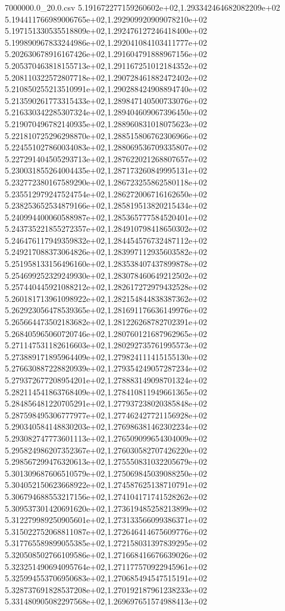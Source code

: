 \begin{filecontents*}{7000000.0_20.0.csv}
5.191672277159260602e+02,1.293342464682082209e+02
5.194411766989006765e+02,1.292909920909078210e+02
5.197151330535518809e+02,1.292476127246418400e+02
5.199890967833244986e+02,1.292041084103411777e+02
5.202630678916167426e+02,1.291604791888967156e+02
5.205370463818155713e+02,1.291167251012184352e+02
5.208110322572807718e+02,1.290728461882472402e+02
5.210850255213510991e+02,1.290288424908894740e+02
5.213590261773315433e+02,1.289847140500733076e+02
5.216330342285307324e+02,1.289404609067396450e+02
5.219070496782140935e+02,1.288960831018075623e+02
5.221810725296298870e+02,1.288515806762306966e+02
5.224551027860034083e+02,1.288069536709335807e+02
5.227291404505293713e+02,1.287622021268807657e+02
5.230031855264004435e+02,1.287173260849995131e+02
5.232772380167589290e+02,1.286723255862580118e+02
5.235512979247524754e+02,1.286272006716162650e+02
5.238253652534879166e+02,1.285819513820215434e+02
5.240994400060588987e+02,1.285365777584520401e+02
5.243735221855272357e+02,1.284910798418650302e+02
5.246476117949359832e+02,1.284454576732487112e+02
5.249217088373064826e+02,1.283997112935603582e+02
5.251958133156496160e+02,1.283538407437899878e+02
5.254699252329249930e+02,1.283078460649212502e+02
5.257440445921088212e+02,1.282617272979432528e+02
5.260181713961098922e+02,1.282154844838387362e+02
5.262923056478539365e+02,1.281691176636149976e+02
5.265664473502183682e+02,1.281226268782702391e+02
5.268405965060720746e+02,1.280760121687962965e+02
5.271147531182616603e+02,1.280292735761995573e+02
5.273889171895964409e+02,1.279824111415155130e+02
5.276630887228820939e+02,1.279354249057287234e+02
5.279372677208954201e+02,1.278883149098701324e+02
5.282114541863768409e+02,1.278410811949661365e+02
5.284856481220705291e+02,1.277937238020385848e+02
5.287598495306777977e+02,1.277462427721156928e+02
5.290340584148830203e+02,1.276986381462302234e+02
5.293082747773601113e+02,1.276509099654304009e+02
5.295824986207352367e+02,1.276030582707426220e+02
5.298567299476320613e+02,1.275550831032205679e+02
5.301309687606510579e+02,1.275069845039088250e+02
5.304052150623668922e+02,1.274587625138710791e+02
5.306794688553217156e+02,1.274104171741528262e+02
5.309537301420691620e+02,1.273619485258213899e+02
5.312279989250905601e+02,1.273133566099386371e+02
5.315022752068811087e+02,1.272646414675609776e+02
5.317765589899055385e+02,1.272158031397839295e+02
5.320508502766109586e+02,1.271668416676639026e+02
5.323251490694095764e+02,1.271177570922945961e+02
5.325994553706950683e+02,1.270685494547515191e+02
5.328737691828537208e+02,1.270192187961238233e+02
5.331480905082297568e+02,1.269697651574988413e+02

\end{filecontents*}
